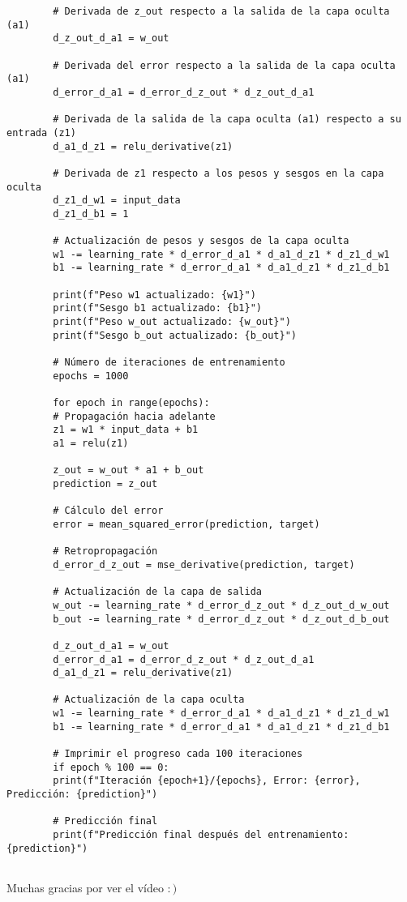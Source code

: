 \documentclass{article}
\begin{document}
\begin{verbatim}
		# Derivada de z_out respecto a la salida de la capa oculta (a1)
		d_z_out_d_a1 = w_out
		
		# Derivada del error respecto a la salida de la capa oculta (a1)
		d_error_d_a1 = d_error_d_z_out * d_z_out_d_a1
		
		# Derivada de la salida de la capa oculta (a1) respecto a su entrada (z1)
		d_a1_d_z1 = relu_derivative(z1)
		
		# Derivada de z1 respecto a los pesos y sesgos en la capa oculta
		d_z1_d_w1 = input_data
		d_z1_d_b1 = 1
		
		# Actualización de pesos y sesgos de la capa oculta
		w1 -= learning_rate * d_error_d_a1 * d_a1_d_z1 * d_z1_d_w1
		b1 -= learning_rate * d_error_d_a1 * d_a1_d_z1 * d_z1_d_b1
		
		print(f"Peso w1 actualizado: {w1}")
		print(f"Sesgo b1 actualizado: {b1}")
		print(f"Peso w_out actualizado: {w_out}")
		print(f"Sesgo b_out actualizado: {b_out}")
		
		# Número de iteraciones de entrenamiento
		epochs = 1000
		
		for epoch in range(epochs):
		# Propagación hacia adelante
		z1 = w1 * input_data + b1
		a1 = relu(z1)
		
		z_out = w_out * a1 + b_out
		prediction = z_out
		
		# Cálculo del error
		error = mean_squared_error(prediction, target)
		
		# Retropropagación
		d_error_d_z_out = mse_derivative(prediction, target)
		
		# Actualización de la capa de salida
		w_out -= learning_rate * d_error_d_z_out * d_z_out_d_w_out
		b_out -= learning_rate * d_error_d_z_out * d_z_out_d_b_out
		
		d_z_out_d_a1 = w_out
		d_error_d_a1 = d_error_d_z_out * d_z_out_d_a1
		d_a1_d_z1 = relu_derivative(z1)
		
		# Actualización de la capa oculta
		w1 -= learning_rate * d_error_d_a1 * d_a1_d_z1 * d_z1_d_w1
		b1 -= learning_rate * d_error_d_a1 * d_a1_d_z1 * d_z1_d_b1
		
		# Imprimir el progreso cada 100 iteraciones
		if epoch % 100 == 0:
		print(f"Iteración {epoch+1}/{epochs}, Error: {error}, Predicción: {prediction}")
		
		# Predicción final
		print(f"Predicción final después del entrenamiento: {prediction}")
		
	\end{verbatim}
	
	Muchas gracias por ver el vídeo $:)$
	
\end{document}
